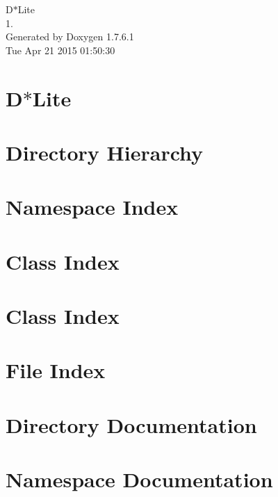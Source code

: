 \documentclass[a4paper]{book}
\begin{document}
\begin{titlepage}
\vspace*{7cm}
\begin{center}
{\Large \-D$\ast$\-Lite \\[1ex]\large 1. }\\
\vspace*{1cm}
{\large \-Generated by Doxygen 1.7.6.1}\\
\vspace*{0.5cm}
{\small Tue Apr 21 2015 01:50:30}\\
\end{center}
\end{titlepage}
\clearemptydoublepage
{}
\tableofcontents
\clearemptydoublepage
{}
\chapter{\-D$\ast$\-Lite}
\label{index}
\chapter{\-Directory \-Hierarchy}

\chapter{\-Namespace \-Index}

\chapter{\-Class \-Index}

\chapter{\-Class \-Index}

\chapter{\-File \-Index}

\chapter{\-Directory \-Documentation}





\chapter{\-Namespace \-Documentation}

\end{document}
